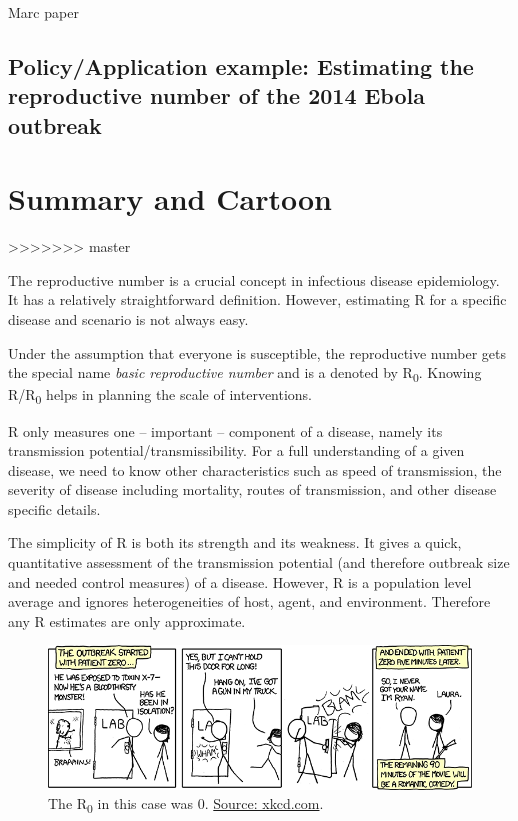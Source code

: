 \documentclass[]{book}
\theoremstyle{definition}
\theoremstyle{definition}
\theoremstyle{definition}
\theoremstyle{remark}
\begin{document}
Marc paper

\subsection{Policy/Application example: Estimating the reproductive
number of the 2014 Ebola
outbreak}\label{policyapplication-example-estimating-the-reproductive-number-of-the-2014-ebola-outbreak}

\section{Summary and Cartoon}\label{summary-and-cartoon-3}
>>>>>>> master

The reproductive number is a crucial concept in infectious disease
epidemiology. It has a relatively straightforward definition. However,
estimating R for a specific disease and scenario is not always easy.

Under the assumption that everyone is susceptible, the reproductive
number gets the special name \emph{basic reproductive number} and is a
denoted by R\textsubscript{0}. Knowing R/R\textsubscript{0} helps in
planning the scale of interventions.

R only measures one -- important -- component of a disease, namely its
transmission potential/transmissibility. For a full understanding of a
given disease, we need to know other characteristics such as speed of
transmission, the severity of disease including mortality, routes of
transmission, and other disease specific details.

The simplicity of R is both its strength and its weakness. It gives a
quick, quantitative assessment of the transmission potential (and
therefore outbreak size and needed control measures) of a disease.
However, R is a population level average and ignores heterogeneities of
host, agent, and environment. Therefore any R estimates are only
approximate.

\begin{figure}
\centering
\includegraphics{./images/xkcd-outbreak-control.png}
\caption{\label{fig:xkcd-outbreak-control}The R\textsubscript{0} in this
case was 0. \href{https://xkcd.com/734/}{Source: xkcd.com}.}
\end{figure}
\end{document}
